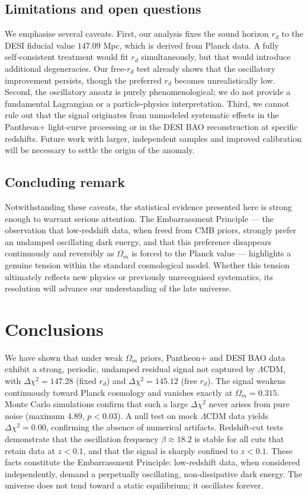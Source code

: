 \documentclass[10pt,a4paper,twocolumn]{article}
\begin{document}
\subsection{Limitations and open questions}
We emphasise several caveats. First, our analysis fixes the sound horizon $r_d$ to the DESI fiducial value $147.09$ Mpc, which is derived from Planck data. A fully self‑consistent treatment would fit $r_d$ simultaneously, but that would introduce additional degeneracies. Our free-$r_d$ test already shows that the oscillatory improvement persists, though the preferred $r_d$ becomes unrealistically low. Second, the oscillatory ansatz is purely phenomenological; we do not provide a fundamental Lagrangian or a particle‑physics interpretation. Third, we cannot rule out that the signal originates from unmodeled systematic effects in the Pantheon+ light‑curve processing or in the DESI BAO reconstruction at specific redshifts. Future work with larger, independent samples and improved calibration will be necessary to settle the origin of the anomaly.

\subsection{Concluding remark}
Notwithstanding these caveats, the statistical evidence presented here is strong enough to warrant serious attention. The Embarrassment Principle — the observation that low‑redshift data, when freed from CMB priors, strongly prefer an undamped oscillating dark energy, and that this preference disappears continuously and reversibly as $\Omega_m$ is forced to the Planck value — highlights a genuine tension within the standard cosmological model. Whether this tension ultimately reflects new physics or previously unrecognised systematics, its resolution will advance our understanding of the late universe.

\section{Conclusions}
We have shown that under weak $\Omega_m$ priors, Pantheon+ and DESI BAO data exhibit a strong, periodic, undamped residual signal not captured by $\Lambda$CDM, with $\Delta\chi^2=147.28$ (fixed $r_d$) and $\Delta\chi^2=145.12$ (free $r_d$). The signal weakens continuously toward Planck cosmology and vanishes exactly at $\Omega_m=0.315$. Monte Carlo simulations confirm that such a large $\Delta\chi^2$ never arises from pure noise (maximum $4.89$, $p<0.03$). A null test on mock $\Lambda$CDM data yields $\Delta\chi^2=0.00$, confirming the absence of numerical artifacts. Redshift-cut tests demonstrate that the oscillation frequency $\beta\approx18.2$ is stable for all cuts that retain data at $z<0.1$, and that the signal is sharply confined to $z<0.1$. These facts constitute the Embarrassment Principle: low-redshift data, when considered independently, demand a perpetually oscillating, non‑dissipative dark energy. The universe does not tend toward a static equilibrium; it oscillates forever.
\end{document}
